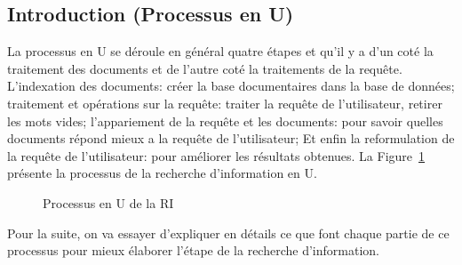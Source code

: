 \subsection{Introduction (Processus en U)}
La processus en U se déroule en général quatre étapes \citep{modern-ir} et qu'il y a d'un coté la traitement des documents et de l'autre coté la traitements de la requête. L'indexation des documents: créer la base documentaires dans la base de données; traitement et opérations sur la requête: traiter la requête de l'utilisateur, retirer les mots vides; l'appariement de la requête et les documents: pour savoir quelles documents répond mieux a la requête de l'utilisateur; Et enfin la reformulation de la requête de l'utilisateur: pour améliorer les résultats obtenues. La Figure~\ref{fig:processus-u} présente la processus de la recherche d'information en U.

\begin{figure}[htbp]
    \begin{center}
    \end{center}
    \caption{Processus en U de la RI \citep{thesaurus-ir-web}}
    \label{fig:processus-u}
\end{figure}

Pour la suite, on va essayer d’expliquer en détails ce que font chaque partie de ce processus pour mieux élaborer l'étape de la recherche d'information.

